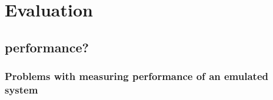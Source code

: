 \chapter{Evaluation}

\label{chap:eval}

\section{performance?}
\subsection{Problems with measuring performance of an emulated system}